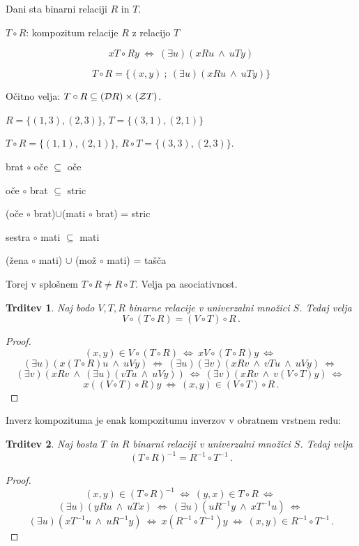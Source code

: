 \documentclass[11pt,paper=b5,DIV=13,headinclude,footinclude]{scrbook}
\newcounter{example}
\def\inn {{~\wedge~}}
\def\cee {{~\Leftrightarrow~}}
\newtheorem*{trditev}{Trditev}
\begin{document}
Dani sta binarni relaciji $R$ in $T$.

$T\circ R$: kompozitum relacije $R$ z relacijo $T$

$$x T\circ R y \cee (\exists u)(xRu\inn uTy)$$

$$T\circ R = \{(x,y)~;~(\exists u)(xRu\inn uTy)\}$$

Očitno velja: $T\circ R\subseteq ({\cal D}R)\times ({\cal Z}T)$.

\bigskip
\begin{example*}

$R = \{(1,3),(2,3)\}$, $T = \{(3,1), (2,1)\}$

$T\circ R = \{(1,1), (2,1)\}$, 
$R\circ T = \{(3,3),(2,3)\}$.

\medskip

brat $\circ$ oče $\subseteq$ oče

oče  $\circ$ brat $\subseteq$ stric

(oče $\circ$ brat)$\cup$(mati $\circ$ brat) = stric

sestra $\circ$ mati $\subseteq$  mati

(žena $\circ$ mati) $\cup$ (mož $\circ$ mati) = tašča
\end{example*}

\medskip
Torej v splošnem $T\circ R\neq R\circ T$. Velja pa asociativnost.


\begin{trditev}
Naj bodo $V, T, R$ binarne relacije v univerzalni množici $S$. Tedaj velja
$$V\circ(T\circ R) = (V\circ T)\circ R\,.$$
\end{trditev}

\begin{proof}
$$(x,y)\in V\circ(T\circ R)\cee x V\circ(T\circ R) y
\cee$$
$$(\exists u)(x(T\circ R)u\inn uVy)
\cee (\exists u)(\exists v)(xRv\inn vTu\inn uVy)\cee $$
$$(\exists v)(xRv\inn (\exists u)(vTu\inn uVy))
\cee(\exists v)(xRv\inn v(V\circ T)y)\cee$$
$$x ((V\circ T)\circ R)y \cee (x,y)\in (V\circ T)\circ R\,.$$
\end{proof}

Inverz kompozituma je enak kompozitumu inverzov v obratnem vrstnem redu:

\begin{trditev}
Naj bosta $T$ in $R$ binarni relaciji v univerzalni množici $S$. Tedaj velja
$$(T\circ R)^{-1} = R^{-1}\circ T^{-1}\,.$$
\end{trditev}

\begin{proof}
$$(x,y)\in (T\circ R)^{-1} \cee (y,x)\in T\circ R
\cee$$
$$(\exists u)(yRu\inn uTx)
\cee (\exists u)(uR^{-1}y\inn xT^{-1}u)
\cee$$
$$(\exists u)(xT^{-1}u\inn uR^{-1}y)
\cee x (R^{-1}\circ T^{-1}) y\cee (x,y)\in R^{-1}\circ T^{-1}\,.$$
\end{proof}
\end{document}
